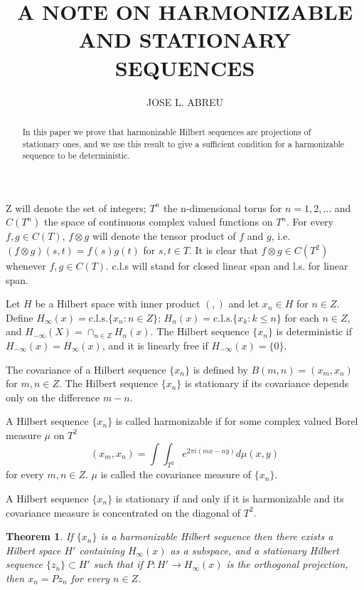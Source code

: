 \documentclass{article}
\title{A NOTE ON HARMONIZABLE AND STATIONARY SEQUENCES}
\author{JOSE L. ABREU}
\date{}
\newtheorem{theorem}{Theorem}
\begin{document}
\maketitle

\begin{abstract}
In this paper we prove that harmonizable Hilbert sequences are projections of
stationary ones, and we use this result to give a sufficient condition for a harmonizable sequence to be deterministic.
\end{abstract}

Z will denote the set of integers; $T^n$ the n-dimensional torus for $n = 1, 2, \ldots$
and $C(T^n)$ the space of continuous complex valued functions on $T^n$. For every
$f, g\in C(T)$, $f \otimes g$ will denote the tensor product of $f$ and $g$, i.e. $(f \otimes g)(s, t) =
f(s)g(t)$ for $s, t \in T$. It is clear that $f \otimes g\in C(T^2)$ whenever $f, g\in C(T)$. c.l.s
will stand for closed linear span and l.s. for linear span.

Let $H$ be a Hilbert space with inner product $(,)$ and let $x_n \in H$ for $n \in Z$.
Define $H_{\infty}(x) = \text{c.l.s.}\{x_n:n \in Z\}$; $H_n(x) = \text{c.l.s.}\{x_k:k \leq n\}$ for each $n \in Z$,
and $H_{-\infty}(X) = \cap_{n\in Z}H_n(x)$. The Hilbert sequence $\{x_n\}$ is deterministic if
$H_{-\infty}(x) = H_{\infty}(x)$, and it is linearly free if $H_{-\infty}(x) = \{0\}$.

The covariance of a Hilbert sequence $\{x_n\}$ is defined by $B(m, n) = (x_m, x_n)$ for $m, n \in Z$. The Hilbert sequence $\{x_n\}$ is stationary if its covariance depends
only on the difference $m - n$.

A Hilbert sequence $\{x_n\}$ is called harmonizable \cite{cramer1, cramer2} if for some complex
valued Borel measure $\mu$ on $T^2$
\begin{equation}
(x_m, x_n) = \int \int_{T^2} e^{2\pi i(mx-ny)} d\mu(x, y)
\end{equation}
for every $m, n \in Z$. $\mu$ is called the covariance measure of $\{x_n\}$.

A Hilbert sequence $\{x_n\}$ is stationary if and only if it is harmonizable and its
covariance measure is concentrated on the diagonal of $T^2$.

\begin{theorem}
If $\{x_n\}$ is a harmonizable Hilbert sequence then there exists a
Hilbert space $H'$ containing $H_{\infty}(x)$ as a subspace, and a stationary Hilbert sequence $\{z_n\} \subset H'$ such that if $P:H' \to H_{\infty}(x)$ is the orthogonal projection, then
$x_n = Pz_n$ for every $n \in Z$.
\end{theorem}
\end{document}
